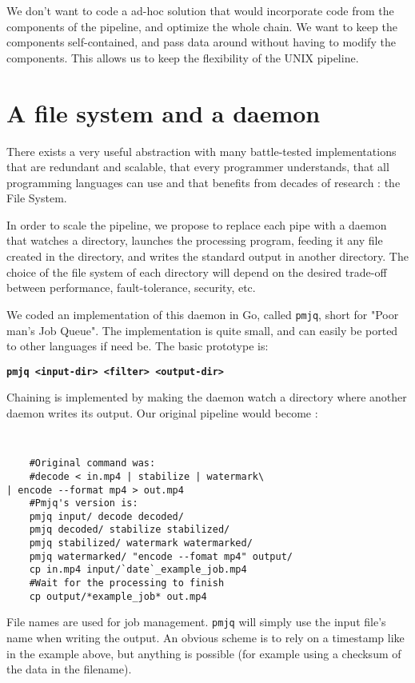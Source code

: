 \documentclass[letterpaper,twocolumn,10pt]{article}
\begin{document}
We don't want to code a ad-hoc solution that would incorporate code from the components of the pipeline, and optimize the whole chain. We want to keep the components self-contained, and pass data around without having to modify the components. This allows us to keep the flexibility of the UNIX pipeline.

\section{A file system and a daemon}
\label{sec:fsd}

There exists a very useful abstraction with many battle-tested implementations that are redundant and scalable, that every programmer understands, that all programming languages can use and that benefits from decades of research : the File System.

In order to scale the pipeline, we propose to replace each pipe with a daemon that watches a directory, launches the processing program, feeding it any file created in the directory, and writes the standard output in another directory. The choice of the file system of each directory will depend on the desired trade-off between performance, fault-tolerance, security, etc. 

We coded an implementation of this daemon in Go, called {\tt pmjq}, short for "Poor man's Job Queue". The implementation is quite small, and can easily be ported to other languages if need be. The basic prototype is:

    {\bf \tt pmjq <input-dir> <filter> <output-dir> \\}

Chaining is implemented by making the daemon watch a directory where another daemon writes its output. Our original pipeline would become :
{\tt \small
\begin{verbatim}
    #Original command was: 
    #decode < in.mp4 | stabilize | watermark\
| encode --format mp4 > out.mp4
    #Pmjq's version is:
    pmjq input/ decode decoded/
    pmjq decoded/ stabilize stabilized/
    pmjq stabilized/ watermark watermarked/
    pmjq watermarked/ "encode --fomat mp4" output/ 
    cp in.mp4 input/`date`_example_job.mp4
    #Wait for the processing to finish
    cp output/*example_job* out.mp4
\end{verbatim}
}

File names are used for job management. {\tt pmjq} will simply use the input file's name when writing the output. An obvious scheme is to rely on a timestamp like in the example above, but anything is possible (for example using a checksum of the data in the filename).
\end{document}
